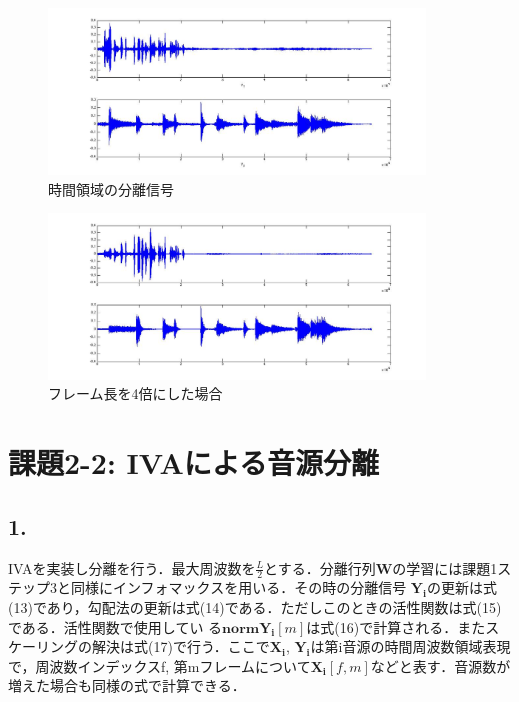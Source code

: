 \documentclass[a4j]{jarticle}
\begin{document}
\begin{figure}[htb]
 \begin{center}
  \includegraphics[width=10cm, clip, bb=0 0 1152 510]{pic/k212.jpg}
  \caption{時間領域の分離信号}
  \label{k212}
 \end{center}
\end{figure}

\begin{figure}[htb]
 \begin{center}
  \includegraphics[width=10cm, clip, bb=0 0 1152 508]{pic/k212long.jpg}
  \caption{フレーム長を4倍にした場合}
  \label{k212long}
 \end{center}
\end{figure}

\section*{課題2-2: IVAによる音源分離}
\subsection*{1.}
IVAを実装し分離を行う．最大周波数を$\frac{L}{2}$とする．分離行列$\bm{W}$の学習には課題1ステップ3と同様にインフォマックスを用いる．その時の分離信号
$\bm{Y_i}$の更新は式(13)であり，勾配法の更新は式(14)である．ただしこのときの活性関数は式(15)である．活性関数で使用してい
る$\bm{normY_i}[m]$は式(16)で計算される．またスケーリングの解決は式(17)で行う．ここで$\bm{X_i}$, $\bm{Y_i}$は第i音源の時間周波数領域表現
で，周波数インデックスf, 第mフレームについて$\bm{X_i}[f,m]$などと表す．音源数が増えた場合も同様の式で計算できる．
\end{document}
